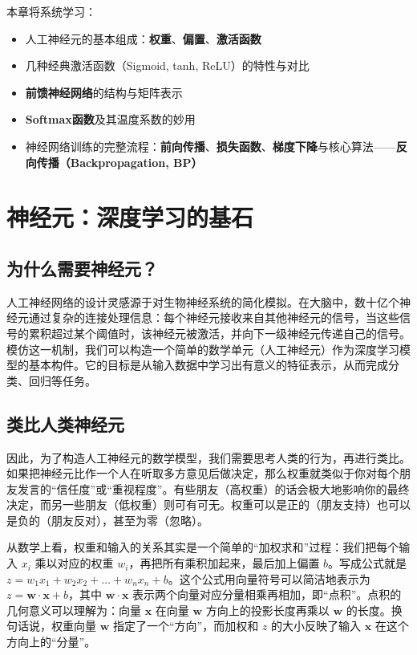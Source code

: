 \documentclass[lang=cn,zihao=-4,a4paper,fontset=windows]{beautybook}
\begin{document}
本章将系统学习：
\begin{itemize}
    \item 人工神经元的基本组成：\textbf{权重}、\textbf{偏置}、\textbf{激活函数}
    \item 几种经典激活函数（Sigmoid, tanh, ReLU）的特性与对比
    \item \textbf{前馈神经网络}的结构与矩阵表示
    \item \textbf{Softmax函数}及其温度系数的妙用
    \item 神经网络训练的完整流程：\textbf{前向传播}、\textbf{损失函数}、\textbf{梯度下降}与核心算法——\textbf{反向传播（Backpropagation, BP）}
\end{itemize}


\section{神经元：深度学习的基石}

\subsection{为什么需要神经元？}
人工神经网络的设计灵感源于对生物神经系统的简化模拟。在大脑中，数十亿个神经元通过复杂的连接处理信息：每个神经元接收来自其他神经元的信号，当这些信号的累积超过某个阈值时，该神经元被激活，并向下一级神经元传递自己的信号。模仿这一机制，我们可以构造一个简单的数学单元（人工神经元）作为深度学习模型的基本构件。它的目标是从输入数据中学习出有意义的特征表示，从而完成分类、回归等任务。

\subsection{类比人类神经元}
因此，为了构造人工神经元的数学模型，我们需要思考人类的行为，再进行类比。如果把神经元比作一个人在听取多方意见后做决定，那么权重就类似于你对每个朋友发言的“信任度”或“重视程度”。有些朋友（高权重）的话会极大地影响你的最终决定，而另一些朋友（低权重）则可有可无。权重可以是正的（朋友支持）也可以是负的（朋友反对），甚至为零（忽略）。

从数学上看，权重和输入的关系其实是一个简单的“加权求和”过程：我们把每个输入 $x_i$ 乘以对应的权重 $w_i$，再把所有乘积加起来，最后加上偏置 $b$。写成公式就是 $z = w_1 x_1 + w_2 x_2 + \dots + w_n x_n + b$。这个公式用向量符号可以简洁地表示为 $z = \mathbf{w} \cdot \mathbf{x} + b$，其中 $\mathbf{w} \cdot \mathbf{x}$ 表示两个向量对应分量相乘再相加，即“点积”。点积的几何意义可以理解为：向量 $\mathbf{x}$ 在向量 $\mathbf{w}$ 方向上的投影长度再乘以 $\mathbf{w}$ 的长度。换句话说，权重向量 $\mathbf{w}$ 指定了一个“方向”，而加权和 $z$ 的大小反映了输入 $\mathbf{x}$ 在这个方向上的“分量”。
\end{document}

